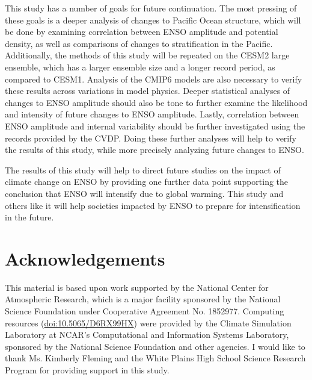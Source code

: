 \documentclass[11pt]{article}
\begin{document}
This study has a number of goals for future continuation. The most pressing of these goals is a deeper analysis of changes to Pacific Ocean structure, which will be done by examining correlation between ENSO amplitude and potential density, as well as comparisons of changes to stratification in the Pacific. Additionally, the methods of this study will be repeated on the CESM2 large ensemble, which has a larger ensemble size and a longer record period, as compared to CESM1. Analysis of the CMIP6 models are also necessary to verify these results across variations in model physics. Deeper statistical analyses of changes to ENSO amplitude should also be tone to further examine the likelihood and intensity of future changes to ENSO amplitude. Lastly, correlation between ENSO amplitude and internal variability should be further investigated using the records provided by the CVDP. Doing these further analyses will help to verify the results of this study, while more precisely analyzing future changes to ENSO.

The results of this study will help to direct future studies on the impact of climate change on ENSO by providing one further data point supporting the conclusion that ENSO will intensify due to global warming. This study and others like it will help societies impacted by ENSO to prepare for intensification in the future.

\section{Acknowledgements}
\label{sec:org9a83329}
This material is based upon work supported by the National Center for Atmospheric Research, which is a major facility sponsored by the National Science Foundation under Cooperative Agreement No. 1852977. Computing resources (\href{https://doi.org/10.5065/D6RX99HX}{doi:10.5065/D6RX99HX}) were provided by the Climate Simulation Laboratory at NCAR's Computational and Information Systems Laboratory, sponsored by the National Science Foundation and other agencies. I would like to thank Ms. Kimberly Fleming and the White Plains High School Science Research Program for providing support in this study.



\end{document}

